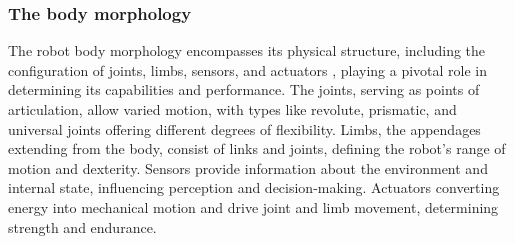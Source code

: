\subsubsection{The body morphology}
The robot body morphology encompasses its physical structure, including the configuration of joints, limbs, sensors, and actuators \cite{Pfeifer2007SelfOrganizationEmbodiment}, playing a pivotal role in determining its capabilities and performance. The joints, serving as points of articulation, allow varied motion, with types like revolute, prismatic, and universal joints offering different degrees of flexibility. Limbs, the appendages extending from the body, consist of links and joints, defining the robot's range of motion and dexterity. Sensors provide information about the environment and internal state, influencing perception and decision-making. Actuators converting energy into mechanical motion and drive joint and limb movement, determining strength and endurance.

%

